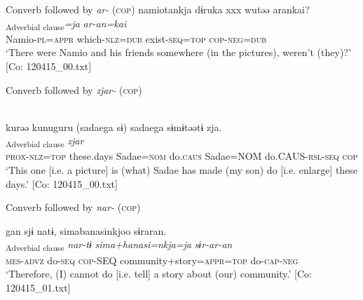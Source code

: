 \exi{} Converb followed by \textit{ar-} (\textsc{cop})
\ex %
    \glll  namiotankja  dɨruka  xxx  wutəə    arankai?\\
      [\textit{namio-taa=nkja}  \textit{dɨ-ru=ka}  {}  \textit{wur-tɨ}]\textsubscript{Adverbial clause}\textit{=ja}    \textit{ar-an=kai}\\
      Namio-\textsc{pl}=\textsc{appr}  which-\textsc{nlz}=\textsc{dub}   {} exist-\textsc{seq}=\textsc{top}   \textsc{cop}-\textsc{neg}=\textsc{dub}\\
      \glt       ‘There were Namio and his friends somewhere (in the pictures), weren’t (they)?’ [Co: 120415\_00.txt]

\exi{} Converb followed by \textit{zjar-} (\textsc{cop})

\ex \relax [= (8-123 a)]\\%
    \glll  kurəə  kunuguru  (sadaega  sɨ)   sadaega  sɨmɨtəətɨ  zja.\\
      [\textit{ku-rɨ=ja}  \textit{kunuguru}  \textit{sadae=ga}  \textit{sɨmɨr}   \textit{sadae=ga}  \textit{sɨmɨr-təər-tɨ}]\textsubscript{Adverbial clause}  \textit{zjar}\\
      \textsc{prox}-\textsc{nlz}=\textsc{top}  these.days  Sadae=\textsc{nom}  do.\textsc{caus}   Sadae=NOM  do.CAUS-\textsc{rsl}-\textsc{seq}  \textsc{cop}\\
      \glt ‘This one [i.e. a picture] is (what) Sadae has made (my son) do [i.e. enlarge] these days.’   [Co: 120415\_00.txt]

\exi{}  Converb followed by \textit{nar-} (\textsc{cop})

\ex %
     \glll  gan  sjɨ  natɨ,  simabanasinkjoo  sɨraran.\\
      [\textit{ga-n}  \textit{sɨr-tɨ}]\textsubscript{Adverbial clause}  \textit{nar-tɨ}  \textit{sima+hanasi=nkja=ja}  \textit{sɨr-ar-an}\\
      \textsc{mes}-\textsc{advz}  do-\textsc{seq}  \textsc{cop}-SEQ  community+story=\textsc{appr}=\textsc{top}   do-\textsc{cap}-\textsc{neg}\\
      \glt       ‘Therefore, (I) cannot do [i.e. tell] a story about (our) community.’ [Co: 120415\_01.txt]
    \z
\z

